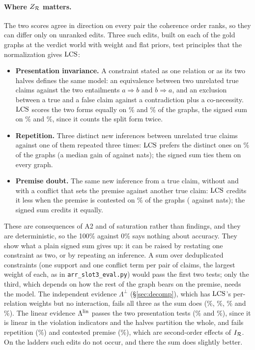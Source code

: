 \paragraph{Where $Z_{\mathcal{R}}$ matters.} The two scores agree in direction on every pair the coherence
order ranks, so they can differ only on unranked edits. Three such edits, built on each of the
\zsEqvN{} gold graphs at the verdict world with weight \zsP{} and flat priors, test principles that
the normalization gives $\mathrm{LCS}$:
\begin{itemize}[leftmargin=1.2em,itemsep=1pt,topsep=2pt]
\item \textbf{Presentation invariance.} A constraint stated as one relation or as its two halves
  defines the same model: an equivalence between two unrelated true claims against the two
  entailments $a\Rightarrow b$ and $b\Rightarrow a$, and an exclusion between a true and a false
  claim against a contradiction plus a co-necessity. $\mathrm{LCS}$ scores the two forms equally on
  \zsEqvLcs\% and \zsExcLcs\% of the graphs, the signed sum on \zsEqvSum\% and \zsExcSum\%, since
  it counts the split form twice.
\item \textbf{Repetition.} Three distinct new inferences between unrelated true claims against one
  of them repeated three times: $\mathrm{LCS}$ prefers the distinct ones on \zsRepLcs\% of the
  \zsRepN{} graphs (a median gain of \zsRepGainNew{} against \zsRepGainRep{} nats); the signed sum
  ties them on every graph.
\item \textbf{Premise doubt.} The same new inference from a true claim, without and with a
  conflict that sets the premise against another true claim: $\mathrm{LCS}$ credits it less when the
  premise is contested on \zsDoubtLcs\% of the \zsDoubtN{} graphs (\zsDoubtGainDoubt{} against
  \zsDoubtGainPlain{} nats); the signed sum credits it equally.
\end{itemize}
These are consequences of A2 and of saturation rather than findings, and they are deterministic,
so the 100\% against 0\% says nothing about accuracy. They show what a plain signed sum gives up:
it can be raised by restating one constraint as two, or by repeating an inference. A sum over
deduplicated constraints (one support and one conflict term per pair of claims, the largest weight of
each, as in \texttt{arr\_slot3\_eval.py}) would pass the first
two tests; only the third, which depends on how the rest of the graph bears on the premise, needs
the model. The independent evidence $\Lambda^{\perp}$ (\S\ref{sec:decomp}), which has $\mathrm{LCS}$'s
per-relation weights but no interaction, fails all three as the sum does (\zsEqvIndep\%,
\zsExcIndep\%, \zsRepIndep\% and \zsDoubtIndep\%). The linear evidence $\Lambda^{\mathrm{lin}}$ passes the two
presentation tests (\zsEqvLin\% and \zsExcLin\%), since it is linear in the violation indicators and
the halves partition the whole, and fails repetition (\zsRepLin\%) and contested premise
(\zsDoubtLin\%), which are second-order effects of $I_{\mathcal{R}}$. On the ladders such edits do not occur, and there the sum does slightly better.

